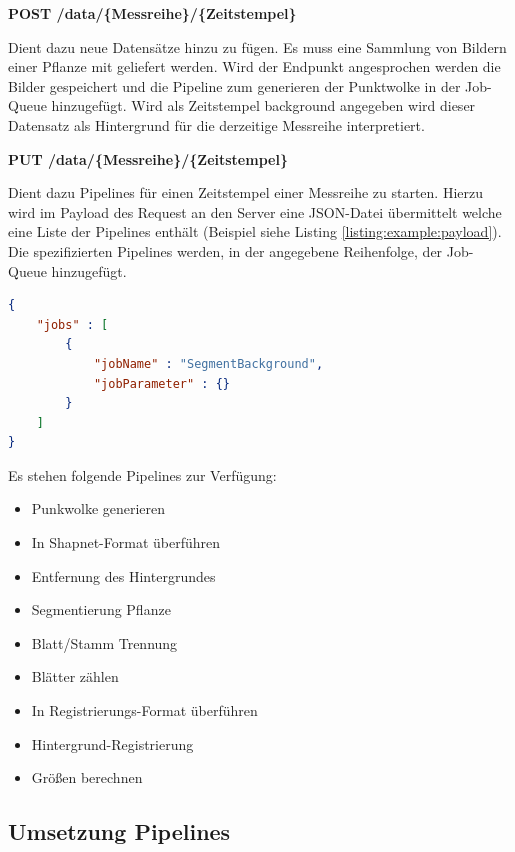 \documentclass[12pt,titlepage, twoside]{article}
\begin{document}
\textbf{POST /data/\{Messreihe\}/\{Zeitstempel\}}

Dient dazu neue Datensätze hinzu zu fügen. Es muss eine Sammlung von Bildern einer Pflanze mit geliefert werden. 
Wird der Endpunkt angesprochen werden die Bilder gespeichert und die Pipeline zum generieren der Punktwolke in der Job-Queue hinzugefügt.
Wird als Zeitstempel \glqq background\grqq{} angegeben wird dieser Datensatz als Hintergrund für die derzeitige Messreihe interpretiert.

\textbf{PUT /data/\{Messreihe\}/\{Zeitstempel\}}

Dient dazu Pipelines für einen Zeitstempel einer Messreihe zu starten. Hierzu wird im Payload des Request an den Server eine JSON-Datei übermittelt welche eine Liste der Pipelines enthält (Beispiel siehe Listing \ref{listing:example:payload}).
Die spezifizierten Pipelines werden, in der angegebene Reihenfolge, der Job-Queue hinzugefügt.
\\

\begin{lstlisting}[language=json, caption={Beispiel Payload zum starten einer Pipeline}, captionpos=b, label=listing:example:payload]
{
    "jobs" : [
        {
            "jobName" : "SegmentBackground",
            "jobParameter" : {}
        }
    ]
}
\end{lstlisting}

Es stehen folgende Pipelines zur Verfügung:

\begin{itemize}
\item Punkwolke generieren
\item In Shapnet-Format überführen
\item Entfernung des Hintergrundes
\item Segmentierung Pflanze
\item Blatt/Stamm Trennung
\item Blätter zählen
\item In Registrierungs-Format überführen
\item Hintergrund-Registrierung
\item Größen berechnen
\end{itemize}


\subsection{Umsetzung Pipelines}
\label{sec:realisierung:implementierung5}
\end{document}
